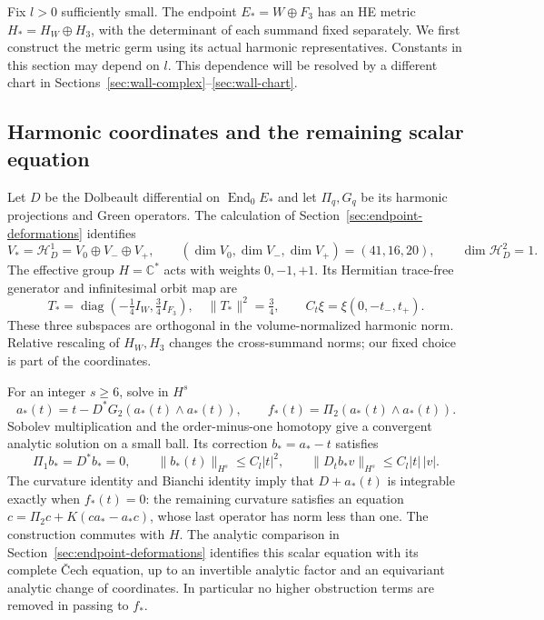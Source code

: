 \documentclass[11pt]{amsart}
\theoremstyle{definition}
\theoremstyle{remark}
\newcommand{\CC}{\mathbb C}
\newcommand{\End}{\operatorname{End}}
\newcommand{\diag}{\operatorname{diag}}
\newcommand{\cH}{\mathcal H}
\begin{document}
Fix $l>0$ sufficiently small. The endpoint $E_*=W\oplus F_3$
has an HE metric $H_*=H_W\oplus H_3$, with the determinant of each
summand fixed separately. We first construct the metric germ using its
actual harmonic representatives. Constants in this section may depend
on $l$. This dependence will be resolved by a different chart in
Sections~\ref{sec:wall-complex}--\ref{sec:wall-chart}.

\subsection{Harmonic coordinates and the remaining scalar equation}
Let $D$ be the Dolbeault differential on $\End_0E_*$ and let
$\Pi_q,G_q$ be its harmonic projections and Green operators. The
calculation of Section~\ref{sec:endpoint-deformations} identifies
\[
 V_*=\cH^1_D=V_0\oplus V_-\oplus V_+,
 \qquad (\dim V_0,\dim V_-,\dim V_+)=(41,16,20),
 \qquad \dim\cH^2_D=1.
\]
The effective group $H=\CC^*$ acts with weights $0,-1,+1$.
Its Hermitian trace-free generator and infinitesimal orbit map are
\begin{equation}\label{eq:endpoint-generator}
 T_* =\diag(-\tfrac14 I_W,\tfrac34 I_{F_3}),\quad
 \|T_*\|^2=\tfrac34,\qquad
 C_t\xi=\xi(0,-t_-,t_+).
\end{equation}
These three subspaces are orthogonal in the volume-normalized harmonic
norm. Relative rescaling of $H_W,H_3$ changes the cross-summand norms;
our fixed choice is part of the coordinates.

For an integer $s\ge6$, solve in $H^s$
\begin{equation}\label{eq:endpoint-kuranishi}
 a_*(t)=t-D^*G_2(a_*(t)\wedge a_*(t)),\qquad
 f_*(t)=\Pi_2(a_*(t)\wedge a_*(t)).
\end{equation}
Sobolev multiplication and the order-minus-one homotopy give a
convergent analytic solution on a small ball. Its correction $b_*=a_*-t$
satisfies
\begin{equation}\label{eq:endpoint-reconstruction-bounds}
 \Pi_1b_*=D^*b_*=0,\qquad
 \|b_*(t)\|_{H^s}\le C_l|t|^2,\qquad
 \|D_tb_*v\|_{H^s}\le C_l|t|\,|v|.
\end{equation}
The curvature identity and Bianchi identity imply that $D+a_*(t)$ is
integrable exactly when $f_*(t)=0$: the remaining curvature satisfies
an equation $c=\Pi_2c+K(ca_*-a_*c)$, whose last operator has norm less
than one. The construction commutes with $H$. The analytic comparison
in Section~\ref{sec:endpoint-deformations} identifies this scalar equation
with its complete \v Cech equation, up to an invertible analytic factor
and an equivariant analytic change of coordinates. In particular no
higher obstruction terms are removed in passing to $f_*$.
\end{document}
